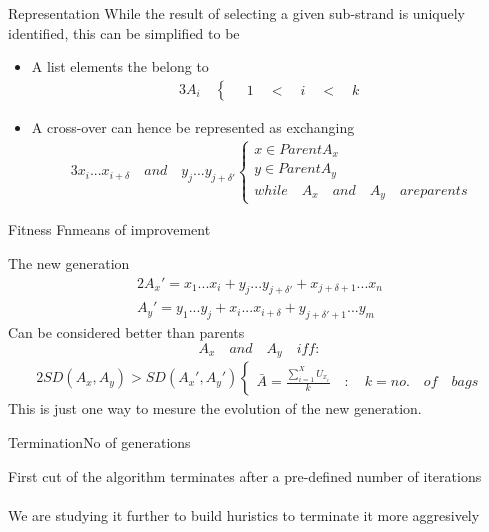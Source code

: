 \documentclass{beamer}
\begin{document}
\begin{frame}{Representation}
  While the result of selecting a given sub-strand is uniquely identified, this can be simplified to be
  \pause
  \begin{itemize}
  \item A list elements the belong to 
    \begin{alignat}{3}
      A_i\quad 
      \begin{cases}
        \quad 1\quad <\quad i\quad <\quad k
      \end{cases}
    \end{alignat}
    \pause
  \item A cross-over can hence be represented as exchanging
    \begin{alignat}{3}
      x_{i}...x_{i + \delta}\quad and\quad y_{j}...y_{j + \delta'}
      \begin{cases}
        x \in Parent A_x\\
        y \in Parent A_y\\
        while\quad A_x\quad and\quad A_y\quad are parents
      \end{cases}
    \end{alignat}
  \end{itemize}
\end{frame}

\begin{frame}{Fitness Fn}{means of improvement}
  \begin{center}
    The new generation
    \begin{alignat}{2}
      A_x' =x_1...x_{i} + y_j...y_{j + \delta'} + x_{j+\delta+1}...x_n\\
      A_y' =y_1...y_{j} + x_i...x_{i + \delta} + y_{j+\delta'+1}...y_m
    \end{alignat}
    Can be considered better than parents $$A_x\quad and\quad A_y\quad iff:$$
    \begin{alignat}{2}
      SD(A_x,A_y) > SD(A_x', A_y') 
      \begin{cases}
        \bar{A} = \frac{\sum_{i=1}^XU_{x_i}}{k}\quad :\quad k = no.\quad of\quad bags
      \end{cases}
    \end{alignat}
    This is just one way to mesure the evolution of the new generation.\\
  \end{center}
\end{frame}

\begin{frame}{Termination}{No of generations}
  \begin{center}
    {\large First cut of the algorithm terminates after a pre-defined number of iterations}\\
    \quad\\
    {\small We are studying it further to build huristics to terminate it more aggresively }
  \end{center}
\end{frame}
\end{document}
